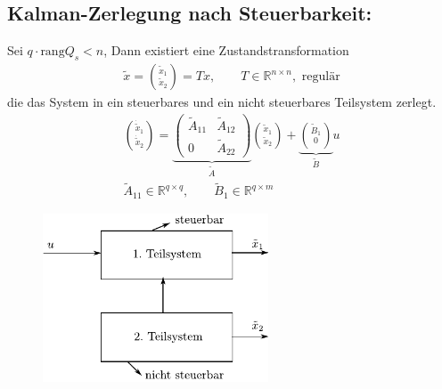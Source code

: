 \documentclass[ngerman]{tudscrreprt}
\begin{document}
\subsection*{Kalman-Zerlegung nach Steuerbarkeit:}
Sei $q\cdot \text{rang} Q_s < n$, Dann existiert eine Zustandstransformation \begin{align*}
\tilde x = \binom{\tilde x_1}{\tilde x_2} = Tx, \qquad T\in \mathbb{R}^{n\times n}, \text{ regulär}
\end{align*} 
die das System in ein steuerbares und ein nicht steuerbares Teilsystem zerlegt. 
\begin{align*}
\binom{\dot{\tilde{x}}_1}{\dot{\tilde{x}}_2} = \underbrace{\begin{pmatrix}
\tilde A_{11} & \tilde A_{12}\\ 0 & \tilde A_{22}
\end{pmatrix}}_{\tilde A}
\binom{\tilde x_1}{\tilde x_2} + \underbrace{\binom{\tilde B_1}{0}}_{\tilde B}u\\ 
\tilde A_{11} \in \mathbb{R}^{q\times q}, \qquad \tilde B_1 \in \mathbb{R}^{q\times m}
\end{align*}
\begin{figure}[H]
\centering
\def\svgwidth{200pt} 
  \includegraphics[width=6.7cm]{kalmanzerl.pdf}
\end{figure}
\end{document}
